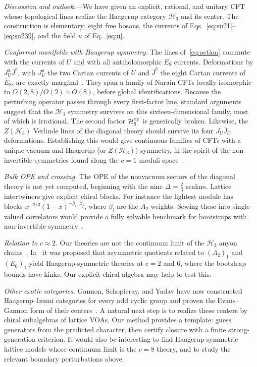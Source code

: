 \documentclass[aps,prl,twocolumn,superscriptaddress,nofootinbib]{revtex4-2}
\newcommand{\cH}{\mathcal H}
\begin{document}
\textit{Discussion and outlook.}---We have given an explicit, rational,
and unitary CFT whose topological lines realize the Haagerup category
$\cH_3$ and its center. The construction is elementary: eight free
bosons, the currents of Eqs.~\eqref{eq:su21}--\eqref{eq:su239}, and
the field $u$ of Eq.~\eqref{eq:u}.

\emph{Conformal manifolds with Haagerup symmetry.} The lines
of~\eqref{eq:action} commute with the currents of $U$ and with all
antiholomorphic $E_8$ currents. Deformations by $J^a_U\bar J^b$, with
$J^a_U$ the two Cartan currents of $U$ and $\bar J^b$ the eight Cartan
currents of $\overline{E}_8$, are exactly marginal~\cite{FR}. They span
a family of Narain CFTs locally isomorphic to $O(2,8)/O(2)\times O(8)$,
before global identifications.
Because the perturbing operator passes through every first-factor line,
standard arguments~\cite{CLSWY} suggest that the $\cH_3$ symmetry
survives on this sixteen-dimensional family, most of which is
irrational. The second factor $\cH_3^{\rm op}$ is generically broken.
Likewise, the $Z(\cH_3)$ Verlinde lines of the diagonal theory should
survive its four $J_U\bar J_U$ deformations. Establishing this would
give continuous families of CFTs with a unique vacuum and Haagerup (or
$Z(\cH_3)$) symmetry, in the spirit of the non-invertible symmetries found along
the $c=1$ moduli space~\cite{TW}.

\emph{Bulk OPE and crossing.} The OPE of the nonvacuum sectors of the
diagonal theory is not yet computed, beginning with the nine
$\Delta=\tfrac23$ scalars. Lattice intertwiners give explicit chiral
blocks. For instance the lightest module has blocks
$x^{-2/3}(1-x)^{-\beta_i\cdot\beta_j}$, where $\beta_i$ are the $A_2$
weights. Sewing these into single-valued correlators would provide a
fully solvable benchmark for bootstraps with non-invertible
symmetry~\cite{LS23}.

\emph{Relation to $c\approx2$.} Our theories are not the continuum
limit of the $\cH_3$ anyon chains~\cite{HLOTT,VLVWOHV}.
In~\cite{AHKZ} it was proposed that asymmetric quotients related to
$(A_2)_1$ and $(E_6)_1$ yield Haagerup-symmetric theories at $c=2$ and
$6$, where the bootstrap bounds have kinks. Our explicit chiral algebra
may help to test this.

\emph{Other exotic categories.} Gannon, Schopieray, and Yadav have now
constructed Haagerup--Izumi categories for every odd cyclic group and
proven the Evans--Gannon form of their centers~\cite{GSY}. A natural
next step is to realize these centers by chiral subalgebras of lattice
VOAs. Our method provides a template: guess generators from the
predicted character, then certify closure with a finite
strong-generation criterion. It would also be interesting to find
Haagerup-symmetric lattice models whose continuum limit is the
$c=8$ theory, and to study the relevant boundary perturbations above.
\end{document}
